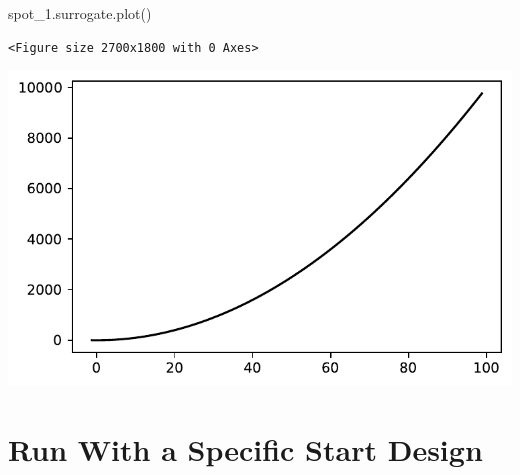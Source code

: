 \documentclass[
  letterpaper,
  DIV=11,
  numbers=noendperiod]{scrreprt}
\newenvironment{Shaded}{\begin{snugshade}}{\end{snugshade}}
\newcommand{\NormalTok}[1]{\textcolor[rgb]{0.00,0.23,0.31}{#1}}
\begin{document}
\begin{Shaded}
\begin{Highlighting}[]
\NormalTok{spot\_1.surrogate.plot()}
\end{Highlighting}
\end{Shaded}

\begin{verbatim}
<Figure size 2700x1800 with 0 Axes>
\end{verbatim}

\includegraphics{a_04_spot_doc_files/figure-pdf/cell-9-output-2.pdf}

\section{Run With a Specific Start
Design}\label{run-with-a-specific-start-design}
\end{document}
